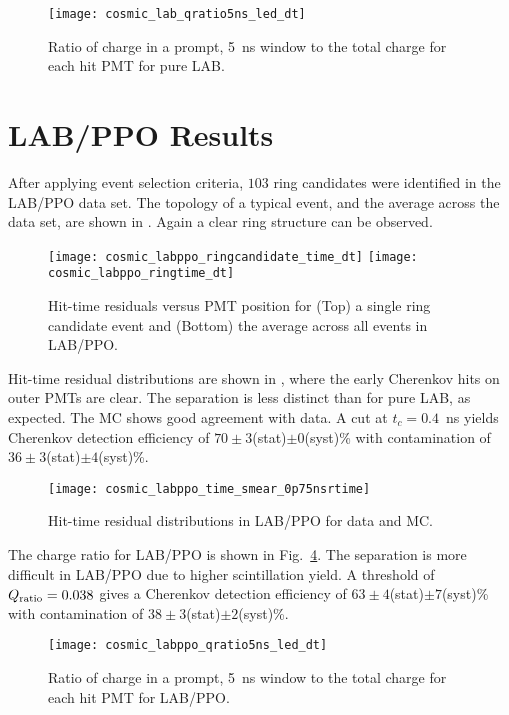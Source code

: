 \begin{figure}
	\centering
	\texttt{[image: cosmic\_lab\_qratio5ns\_led\_dt]}
	\caption{Ratio of charge in a prompt, 5~ns window to the total charge for each hit PMT  for pure LAB.}
	\label{f:labQ}
\end{figure}

\section{LAB/PPO Results}

After applying event selection criteria, $103$ ring candidates were identified in the LAB/PPO data set. 
The topology of a typical event, and the average across the data set, are shown in .  Again a clear ring structure can be observed. 
\begin{figure}[!t]
	\centering
	\texttt{[image: cosmic\_labppo\_ringcandidate\_time\_dt]}
	\texttt{[image: cosmic\_labppo\_ringtime\_dt]}	
	\caption{Hit-time residuals versus PMT position for (Top) a single ring candidate event and (Bottom) the average across all events in LAB/PPO.}
	\label{fig:labppo_ring}
\end{figure}
Hit-time residual distributions are shown in , where the early Cherenkov hits on outer PMTs are clear. The separation is less distinct than for pure LAB, as expected. The MC shows good agreement with data.  
A  cut at $ t_c = 0.4$~ns yields Cherenkov detection efficiency of  $70 \pm 3 $(stat)$\pm0$(syst)\% with contamination of $36 \pm 3 $(stat)$\pm4$(syst)\%. 



\begin{figure}
	\centering
	\texttt{[image: cosmic\_labppo\_time\_smear\_0p75nsrtime]}
	\caption{Hit-time residual distributions in LAB/PPO for data and MC.}
	\label{fig:labppo}
\end{figure}

The charge ratio for LAB/PPO is shown in Fig.~\ref{f:labppoQ}.   The separation is more difficult in LAB/PPO due to higher scintillation yield.  A threshold of $Q_{\rm ratio}=0.038$ gives a Cherenkov detection efficiency of $63\pm4$(stat)$\pm7$(syst)\% with contamination of $38\pm3$(stat)$\pm2$(syst)\%.

\begin{figure}
	\centering
	\texttt{[image: cosmic\_labppo\_qratio5ns\_led\_dt]}
	\caption{Ratio of charge in a prompt, 5~ns window to the total charge for each hit PMT for LAB/PPO.}
	\label{f:labppoQ}
\end{figure}

